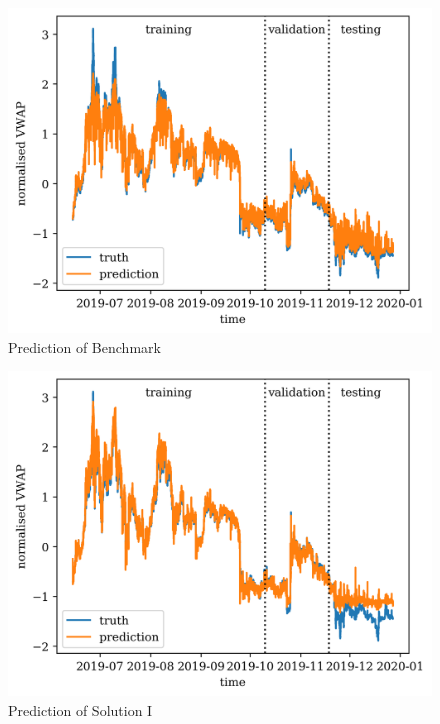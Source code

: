 \documentclass[12pt, letterpaper]{article}
\begin{document}
\begin{figure}
    \centering
    \includegraphics{figures/pred_linear.png}
    \caption{Prediction of Benchmark}%
    \label{fig:pred0}
\end{figure}

\begin{figure}
    \centering
    \includegraphics{figures/pred_lstm.png}
    \caption{Prediction of Solution I}%
    \label{fig:pred1}
\end{figure}
\end{document}
